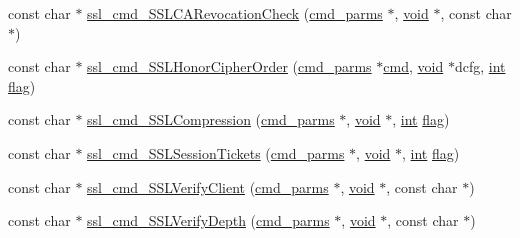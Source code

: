\begin{DoxyCompactItemize}
\item 
const char $\ast$ \hyperlink{group__MOD__SSL__PRIVATE_ga12320b36dcc0ed936a79f652061417b0}{ssl\+\_\+cmd\+\_\+\+S\+S\+L\+C\+A\+Revocation\+Check} (\hyperlink{group__APACHE__CORE__CONFIG_ga1791fbd28d06a9847bad001541c5241e}{cmd\+\_\+parms} $\ast$, \hyperlink{group__MOD__ISAPI_gacd6cdbf73df3d9eed42fa493d9b621a6}{void} $\ast$, const char $\ast$)
\item 
const char $\ast$ \hyperlink{group__MOD__SSL__PRIVATE_ga53ccd428317d4ef6b6c12cff95485f26}{ssl\+\_\+cmd\+\_\+\+S\+S\+L\+Honor\+Cipher\+Order} (\hyperlink{group__APACHE__CORE__CONFIG_ga1791fbd28d06a9847bad001541c5241e}{cmd\+\_\+parms} $\ast$\hyperlink{group__apr__thread__proc_ga7b715f5a87a71c6766684c1798251237}{cmd}, \hyperlink{group__MOD__ISAPI_gacd6cdbf73df3d9eed42fa493d9b621a6}{void} $\ast$dcfg, \hyperlink{pcre_8txt_a42dfa4ff673c82d8efe7144098fbc198}{int} \hyperlink{group__apr__mmap_gac9ec9a6de38e93927dca656ab65d0087}{flag})
\item 
const char $\ast$ \hyperlink{group__MOD__SSL__PRIVATE_ga8dd3e15bff27f921d13e552a68485046}{ssl\+\_\+cmd\+\_\+\+S\+S\+L\+Compression} (\hyperlink{group__APACHE__CORE__CONFIG_ga1791fbd28d06a9847bad001541c5241e}{cmd\+\_\+parms} $\ast$, \hyperlink{group__MOD__ISAPI_gacd6cdbf73df3d9eed42fa493d9b621a6}{void} $\ast$, \hyperlink{pcre_8txt_a42dfa4ff673c82d8efe7144098fbc198}{int} \hyperlink{group__apr__mmap_gac9ec9a6de38e93927dca656ab65d0087}{flag})
\item 
const char $\ast$ \hyperlink{group__MOD__SSL__PRIVATE_ga36e1f7d512e1c1b347484cf276cafff5}{ssl\+\_\+cmd\+\_\+\+S\+S\+L\+Session\+Tickets} (\hyperlink{group__APACHE__CORE__CONFIG_ga1791fbd28d06a9847bad001541c5241e}{cmd\+\_\+parms} $\ast$, \hyperlink{group__MOD__ISAPI_gacd6cdbf73df3d9eed42fa493d9b621a6}{void} $\ast$, \hyperlink{pcre_8txt_a42dfa4ff673c82d8efe7144098fbc198}{int} \hyperlink{group__apr__mmap_gac9ec9a6de38e93927dca656ab65d0087}{flag})
\item 
const char $\ast$ \hyperlink{group__MOD__SSL__PRIVATE_ga2d87d6368326fb8bdc2fc3e283612f9e}{ssl\+\_\+cmd\+\_\+\+S\+S\+L\+Verify\+Client} (\hyperlink{group__APACHE__CORE__CONFIG_ga1791fbd28d06a9847bad001541c5241e}{cmd\+\_\+parms} $\ast$, \hyperlink{group__MOD__ISAPI_gacd6cdbf73df3d9eed42fa493d9b621a6}{void} $\ast$, const char $\ast$)
\item 
const char $\ast$ \hyperlink{group__MOD__SSL__PRIVATE_ga79d1bfd3da1378dbc3d497aeb6c63735}{ssl\+\_\+cmd\+\_\+\+S\+S\+L\+Verify\+Depth} (\hyperlink{group__APACHE__CORE__CONFIG_ga1791fbd28d06a9847bad001541c5241e}{cmd\+\_\+parms} $\ast$, \hyperlink{group__MOD__ISAPI_gacd6cdbf73df3d9eed42fa493d9b621a6}{void} $\ast$, const char $\ast$)

\end{DoxyCompactItemize}
